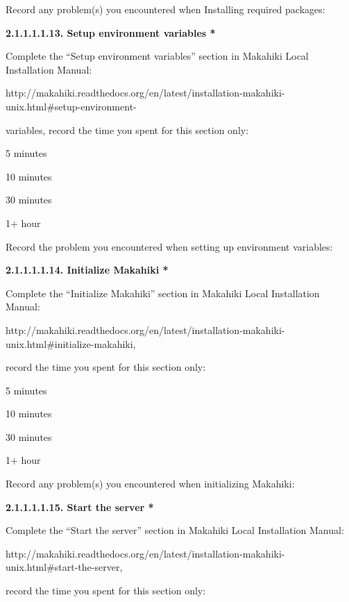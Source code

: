 Record any problem(s) you encountered when Installing required packages: \underline{\hspace{3cm}}

{\bf 2.1.1.1.1.13. Setup environment variables *}

Complete the ``Setup environment variables'' section in Makahiki Local Installation Manual:

http://makahiki.readthedocs.org/en/latest/installation-makahiki-unix.html\#setup-environment-

variables,  record the time you spent for this section only:

\begin{radiobutton}
\item 5 minutes
\item  10 minutes
\item  30 minutes
\item  1+ hour
\end{radiobutton}

Record the problem you encountered when setting up environment variables: \underline{\hspace{3cm}}

{\bf 2.1.1.1.1.14. Initialize Makahiki *}

Complete the ``Initialize Makahiki'' section in Makahiki Local Installation Manual:

http://makahiki.readthedocs.org/en/latest/installation-makahiki-unix.html\#initialize-makahiki, 

record the time you spent for this section only:

\begin{radiobutton}
\item 5 minutes
\item  10 minutes
\item  30 minutes
\item  1+ hour
\end{radiobutton}

Record any problem(s) you encountered when initializing Makahiki: \underline{\hspace{4cm}}

{\bf 2.1.1.1.1.15. Start the server *}

Complete the ``Start the server'' section in Makahiki Local Installation Manual:

http://makahiki.readthedocs.org/en/latest/installation-makahiki-unix.html\#start-the-server, 

record the time you spent for this section only:

